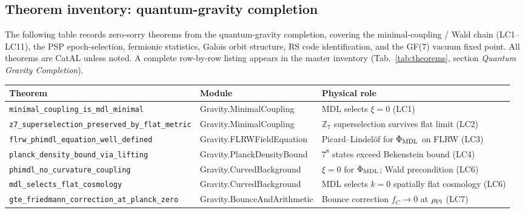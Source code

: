 \documentclass[11pt,a4paper]{article}
\theoremstyle{definition}
\begin{document}
\subsection{Theorem inventory: quantum-gravity completion}\label{subsec:new-theorem-inventory-078}

The following table records zero-sorry theorems from the quantum-gravity completion,
covering the minimal-coupling / Wald chain
(LC1--LC11), the PSP epoch-selection, fermionic statistics, Galois orbit structure, RS code
identification, and the GF(7) vacuum fixed point.  All theorems are CatAL unless noted.
A complete row-by-row listing appears in the master inventory
(Tab.~\ref{tab:theorems}, section \emph{Quantum Gravity Completion}).

\begin{table}[h]
\centering\footnotesize
\setlength{\tabcolsep}{4pt}
\begin{tabular}{@{}p{5.2cm}p{4.8cm}p{4.0cm}@{}}
\toprule
Theorem & Module & Physical role \\
\midrule
\texttt{minimal\_\allowbreak coupling\_\allowbreak is\_\allowbreak mdl\_\allowbreak minimal}
  & Gravity.MinimalCoupling
  & MDL selects $\xi=0$ (LC1) \\[1pt]
\texttt{z7\_\allowbreak superselection\_\allowbreak preserved\_\allowbreak by\_\allowbreak flat\_\allowbreak metric}
  & Gravity.MinimalCoupling
  & $\mathbb{Z}_7$ superselection survives flat limit (LC2) \\[1pt]
\texttt{flrw\_\allowbreak phimdl\_\allowbreak equation\_\allowbreak well\_\allowbreak defined}
  & Gravity.FLRWFieldEquation
  & Picard--Lindel\"of for $\Phi_{\rm MDL}$ on FLRW (LC3) \\[1pt]
\texttt{planck\_\allowbreak density\_\allowbreak bound\_\allowbreak via\_\allowbreak lifting}
  & Gravity.PlanckDensityBound
  & $7^8$ states exceed Bekenstein bound (LC4) \\[1pt]
\texttt{phimdl\_\allowbreak no\_\allowbreak curvature\_\allowbreak coupling}
  & Gravity.CurvedBackground
  & $\xi=0$ for $\Phi_{\rm MDL}$; Wald precondition (LC6) \\[1pt]
\texttt{mdl\_\allowbreak selects\_\allowbreak flat\_\allowbreak cosmology}
  & Gravity.CurvedBackground
  & MDL selects $k=0$ spatially flat cosmology (LC6) \\[1pt]
\texttt{gte\_\allowbreak friedmann\_\allowbreak correction\_\allowbreak at\_\allowbreak planck\_\allowbreak zero}
  & Gravity.BounceAndArithmetic
  & Bounce correction $f_C\to0$ at $\rho_{\rm Pl}$ (LC7) \\[1pt]

\end{tabular}
\end{table}
\end{document}
